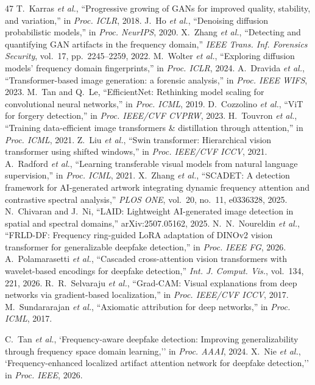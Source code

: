 \documentclass[journal]{IEEEtran}
\begin{document}
\begin{thebibliography}{47}
 T.~Karras \textit{et al.}, ``Progressive growing of GANs for improved quality, stability, and variation,'' in \textit{Proc. ICLR}, 2018.
 J.~Ho \textit{et al.}, ``Denoising diffusion probabilistic models,'' in \textit{Proc. NeurIPS}, 2020.
 X.~Zhang \textit{et al.}, ``Detecting and quantifying GAN artifacts in the frequency domain,'' \textit{IEEE Trans. Inf. Forensics Security}, vol.~17, pp.~2245--2259, 2022.
 M.~Wolter \textit{et al.}, ``Exploring diffusion models' frequency domain fingerprints,'' in \textit{Proc. ICLR}, 2024.
 A.~Dravida \textit{et al.}, ``Transformer-based image generation: a forensic analysis,'' in \textit{Proc. IEEE WIFS}, 2023.
 M.~Tan and Q.~Le, ``EfficientNet: Rethinking model scaling for convolutional neural networks,'' in \textit{Proc. ICML}, 2019.
 D.~Cozzolino \textit{et al.}, ``ViT for forgery detection,'' in \textit{Proc. IEEE/CVF CVPRW}, 2023.
 H.~Touvron \textit{et al.}, ``Training data-efficient image transformers \& distillation through attention,'' in \textit{Proc. ICML}, 2021.
 Z.~Liu \textit{et al.}, ``Swin transformer: Hierarchical vision transformer using shifted windows,'' in \textit{Proc. IEEE/CVF ICCV}, 2021.
 A.~Radford \textit{et al.}, ``Learning transferable visual models from natural language supervision,'' in \textit{Proc. ICML}, 2021.
 X.~Zhang \textit{et al.}, ``SCADET: A detection framework for AI-generated artwork integrating dynamic frequency attention and contrastive spectral analysis,'' \textit{PLOS ONE}, vol.~20, no.~11, e0336328, 2025.
 N.~Chivaran and J.~Ni, ``LAID: Lightweight AI-generated image detection in spatial and spectral domains,'' arXiv:2507.05162, 2025.
 N.~N.~Noureldin \textit{et al.}, ``FRLD-DF: Frequency ring-guided LoRA adaptation of DINOv2 vision transformer for generalizable deepfake detection,'' in \textit{Proc. IEEE FG}, 2026.
 A.~Polamarasetti \textit{et al.}, ``Cascaded cross-attention vision transformers with wavelet-based encodings for deepfake detection,'' \textit{Int. J. Comput. Vis.}, vol.~134, 221, 2026.
 R.~R.~Selvaraju \textit{et al.}, ``Grad-CAM: Visual explanations from deep networks via gradient-based localization,'' in \textit{Proc. IEEE/CVF ICCV}, 2017.
 M.~Sundararajan \textit{et al.}, ``Axiomatic attribution for deep networks,'' in \textit{Proc. ICML}, 2017.

 C.~Tan \textit{et al.}, `Frequency-aware deepfake detection: Improving generalizability through frequency space domain learning,'' in \textit{Proc. AAAI}, 2024.
 X.~Nie \textit{et al.}, `Frequency-enhanced localized artifact attention network for deepfake detection,'' in \textit{Proc. IEEE}, 2026.
\end{thebibliography}
\end{document}

